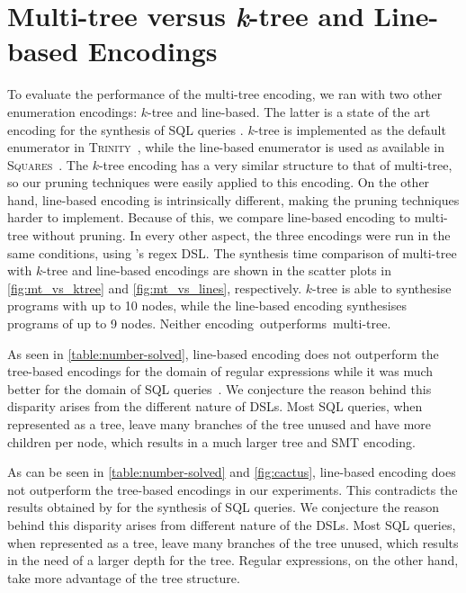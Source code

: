 \section{Multi-tree versus \texorpdfstring{\textit{k}-tree}{k-tree} and Line-based Encodings}\label{sec:multi-tree-vs-encodings}



To evaluate the performance of the multi-tree encoding, we ran \Forest{} with two other enumeration encodings: \(k\)-tree and line-based.
The latter is a state of the art encoding for the synthesis of SQL queries \cite{Orvalho19,DBLP:journals/pvldb/OrvalhoTVMM20}.
\(k\)-tree is implemented as the default enumerator in \textsc{Trinity}~\cite{trinity19}, while the line-based enumerator is used as available in \textsc{Squares}~\cite{squares-webpage}.
The \(k\)-tree encoding has a very similar structure to that of multi-tree, so our pruning techniques were easily applied to this encoding.
%
On the other hand, line-based encoding is intrinsically different, making the pruning techniques harder to implement. Because of this, we compare line-based encoding to multi-tree without pruning.
%
In every other aspect, the three encodings were run in the same conditions, using \Forest{}'s regex \ac{DSL}.
The synthesis time comparison of multi-tree with \(k\)-tree and line-based encodings are shown in the scatter plots in \autoref{fig:mt_vs_ktree} and \autoref{fig:mt_vs_lines}, respectively.
\(k\)-tree is able to synthesise programs with up to 10 nodes, while the line-based encoding synthesises programs of up to 9 nodes. Neither encoding~outperforms~multi-tree.

As seen in \autoref{table:number-solved}, line-based encoding does not outperform the tree-based encodings for the domain of regular expressions while it was much better for the domain of SQL queries~\cite{Orvalho19}. We conjecture the reason behind this disparity arises from the different nature of \ac{DSL}s. Most SQL queries, when represented as a tree, leave many branches of the tree unused and have more children per node, which results in a much larger tree and SMT encoding.

As can be seen in \autoref{table:number-solved} and \autoref{fig:cactus}, line-based encoding does not outperform the tree-based encodings in our experiments. This contradicts the results obtained by \citet{Orvalho19} for the synthesis of SQL queries. We conjecture the reason behind this disparity arises from different nature of the DSLs. Most SQL queries, when represented as a tree, leave many branches of the tree unused, which results in the need of a larger depth for the tree. Regular expressions, on the other hand, take more advantage of the tree structure.

